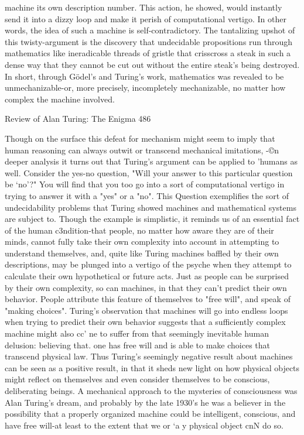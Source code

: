 machine its own description number. This action, he showed, would instantly send it
into a dizzy loop and make it perish of computational vertigo. In other words, the idea
of such a machine is self-contradictory. The tantalizing upshot of this twisty-argument
is the discovery that undecidable propositions run through mathematics like
ineradicable threads of gristle that crisscross a steak in such a dense way that they
cannot be cut out without the entire steak's being destroyed. In short, through Gödel’s
and Turing's work, mathematics was revealed to be unmechanizable-or, more
precisely, incompletely mechanizable, no matter how complex the machine involved.




Review of Alan Turing: The Enigma                                                  486

        Though on the surface this defeat for mechanism might seem to imply that
human reasoning can always outwit or transcend mechanical imitations, -©n deeper
analysis it turns out that Turing's argument can be applied to 'humans as well.
Consider the yes-no question, "Will your answer to this particular question be `no'?"
You will find that you too go into a sort of computational vertigo in trying to answer
it with a "yes" or a "no". This Question exemplifies the sort of undecidability
problems that Turing showed machines and mathematical systems are subject to.
Though the example is simplistic, it reminds us of an essential fact of the human
c3ndition-that people, no matter how aware they are of their minds, cannot fully take
their own complexity into account in attempting to understand themselves, and, quite
like Turing machines baffled by their own descriptions, may be plunged into a vertigo
of the psyche when they attempt to calculate their own hypothetical or future acts.
        Just as people can be surprised by their own complexity, so can machines, in
that they can't predict their own behavior. People attribute this feature of themselves
to "free will", and speak of "making choices". Turing's observation that machines will
go into endless loops when trying to predict their own behavior suggests that a
sufficiently complex machine might also cc' ne to suffer from that seemingly
inevitable human delusion: believing that. one has free will and is able to make
choices that transcend physical law.
        Thus Turing's seemingly negative result about machines can be seen as a
positive result, in that it sheds new light on how physical objects might reflect on
themselves and even consider themselves to be conscious, deliberating beings. A
mechanical approach to the mysteries of consciousness was Alan Turing's dream, and
probably by the late 1930's he was a believer in the possibility that a properly
organized machine could be intelligent, conscious, and have free will-at least to the
extent that we or `a y physical object cnN do so.

